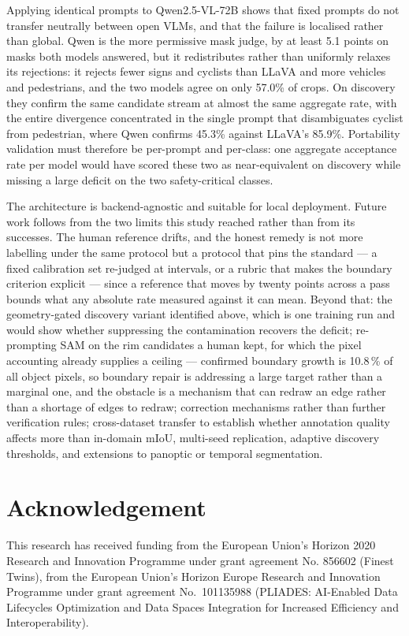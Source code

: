 \documentclass[conference]{IEEEtran}
\begin{document}
Applying identical prompts to Qwen2.5-VL-72B shows that fixed prompts do not transfer neutrally between open VLMs, and that the failure is localised rather than global. Qwen is the more permissive mask judge, by at least 5.1 points on masks both models answered, but it redistributes rather than uniformly relaxes its rejections: it rejects fewer signs and cyclists than LLaVA and more vehicles and pedestrians, and the two models agree on only 57.0\% of crops. On discovery they confirm the same candidate stream at almost the same aggregate rate, with the entire divergence concentrated in the single prompt that disambiguates cyclist from pedestrian, where Qwen confirms 45.3\% against LLaVA's 85.9\%. Portability validation must therefore be per-prompt and per-class: one aggregate acceptance rate per model would have scored these two as near-equivalent on discovery while missing a large deficit on the two safety-critical classes.


The architecture is backend-agnostic and suitable for local deployment.
Future work follows from the two limits this study reached rather than from its successes.
The human reference drifts, and the honest remedy is not more labelling under the same protocol but a
protocol that pins the standard --- a fixed calibration set re-judged at intervals, or a rubric that
makes the boundary criterion explicit --- since a reference that moves by twenty points across a pass
bounds what any absolute rate measured against it can mean.
Beyond that: the geometry-gated discovery variant identified above, which is one training run and would
show whether suppressing the contamination recovers the deficit; re-prompting SAM on the rim candidates
a human kept, for which the pixel accounting already supplies a ceiling --- confirmed boundary growth is
10.8\,\% of all object pixels, so boundary repair is addressing a large target rather than a marginal
one, and the obstacle is a mechanism that can redraw an edge rather than a shortage of edges to redraw;
correction mechanisms rather than further verification rules; cross-dataset transfer to
establish whether annotation quality affects more than in-domain mIoU, multi-seed replication,
adaptive discovery thresholds, and extensions to panoptic or temporal segmentation.

\section*{Acknowledgement}
This research has received funding from the European Union’s Horizon 2020 Research and Innovation Programme under grant agreement No. 856602 (Finest Twins), from the European Union's Horizon Europe Research and Innovation Programme under grant agreement No.~101135988 (PLIADES: AI-Enabled Data Lifecycles Optimization and Data Spaces Integration for Increased Efficiency and Interoperability).



\end{document}
